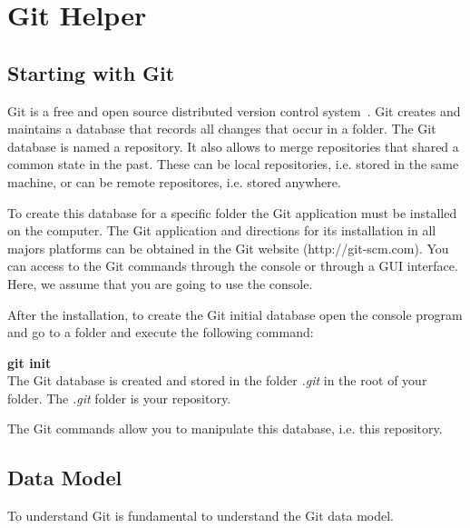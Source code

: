 \chapter{Git Helper}

\begin{refsection}

\section{Starting with Git}

Git is a free and open source distributed version control system~\cite{Chacon14}.
Git creates and maintains a database that records all changes that occur in a folder.
The Git database is named a repository.
It also allows to merge repositories that shared a common state in the past.
These can be local repositories, i.e. stored in the same machine, or can be remote repositores, i.e. stored anywhere.

To create this database for a specific folder the Git application must be installed on the computer.
The Git application and directions for its installation in all majors platforms can be obtained in the Git website (http://git-scm.com). You can access to the Git commands through the console or through a GUI interface.
Here, we assume that you are going to use the console.

After the installation, to create the Git initial database open the console program and go to a folder and execute the following command:
\\[0mm]
\par\textbf{git init}
\\[5mm]
The Git database is created and stored in the folder \emph{.git} in the root of your folder.
The \emph{.git} folder is your repository.

The Git commands allow you to manipulate this database, i.e. this repository.

\section{Data Model}

To understand Git is fundamental to understand the Git data model.


\end{refsection}
